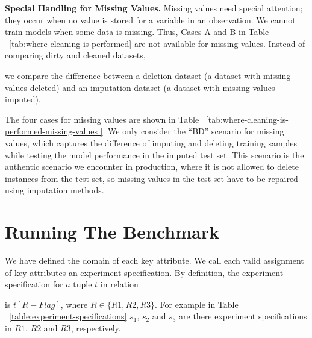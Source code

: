 \textbf{Special Handling for Missing Values.} 
Missing values need special attention; they occur when no value is stored for a variable in an observation. We cannot train models when some data is missing. 
Thus, Cases A and B in Table ~\ref{tab:where-cleaning-is-performed} are not available for missing values. Instead of comparing dirty and cleaned datasets, 

we compare the difference between a deletion dataset (a dataset with missing values deleted) and an imputation dataset (a dataset with missing values imputed). 

The four cases for missing values are shown in Table ~\ref{tab:where-cleaning-is-performed-missing-values }. 
We only consider the “BD” scenario for missing values, which captures the difference of imputing and deleting training samples while testing the model performance in the imputed test set. 
This scenario is the authentic scenario we encounter in production, where it is not allowed to delete instances from the test set, so missing values in the test set have to be repaired using
imputation methods.

\section{Running The Benchmark}

We have defined the domain of each key attribute. We call each
valid assignment of key attributes an experiment specification. By
definition, the experiment specification for $a$ tuple $t$ in relation

is $ t[R - Flag]$, where $R \in \{R1, R2, R3\} $. For example in Table ~\ref{table:experiment-specifications} $s_{1}$, $s_{2}$ and $s_{3}$ are there experiment specifications in $R1$, $R2$ and $R3$, respectively.

